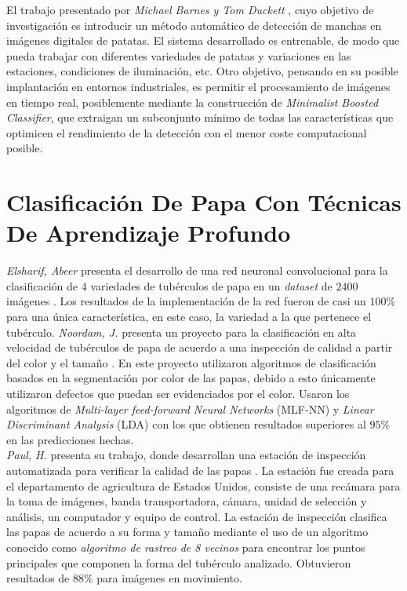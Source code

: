 El trabajo presentado por \textit{Michael Barnes y Tom Duckett} \cite{Barnes2010}, cuyo objetivo de  investigación es introducir un método automático de detección de manchas en imágenes digitales de patatas. El sistema desarrollado es entrenable, de modo que pueda trabajar con diferentes variedades de patatas y variaciones en las estaciones, condiciones de iluminación, etc. Otro objetivo, pensando en su posible implantación en entornos industriales, es permitir el procesamiento de imágenes en tiempo real, posiblemente mediante la construcción de \textit{Minimalist Boosted Classifier}, que extraigan un subconjunto mínimo de todas las características que optimicen el rendimiento de la detección con el menor coste computacional posible.


\section{Clasificación De Papa Con Técnicas De Aprendizaje Profundo}

\textit{Elsharif, Abeer} presenta el desarrollo de una red neuronal convolucional  para la clasificación de $4$ variedades de tubérculos de papa en un \textit{dataset} de $2400$ imágenes \cite{elsharif2020potato}. Los resultados de la implementación de la red fueron de casi un $100\%$ para una única característica, en este caso, la variedad a la que pertenece el tubérculo. \textit{Noordam, J.} presenta un proyecto para la clasificación en alta velocidad de tubérculos de papa de acuerdo a una inspección de calidad a partir del color y el tamaño \cite{noordam2000high}. En este proyecto utilizaron algoritmos de clasificación basados en la segmentación por color de las papas, debido a esto únicamente utilizaron defectos que puedan ser evidenciados por el color. Usaron los algoritmos de \textit{Multi-layer feed-forward Neural Networks} (MLF-NN) y \textit{Linear Discriminant Analysis} (LDA) con los que obtienen resultados superiores al $95\%$ en las predicciones hechas.\\

\textit{Paul, H.} presenta su trabajo, donde desarrollan una estación de inspección automatizada para verificar la calidad de las papas \cite{heinemann1996automated}. La estación fue creada para el departamento de agricultura de Estados Unidos, consiste de una recámara para la toma de imágenes, banda transportadora, cámara, unidad de selección y análisis, un computador y equipo de control. La estación de inspección clasifica las papas de acuerdo a su forma y tamaño mediante el uso de un algoritmo conocido como \textit{algoritmo de rastreo de 8 vecinos} para encontrar los puntos principales que componen la forma del tubérculo analizado. Obtuvieron resultados de $88\%$ para imágenes en movimiento.









